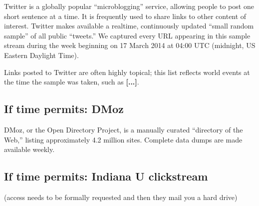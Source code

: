 \documentclass[tinymargin]{zarticle}
\def\todo#1{{\color{todocolor}\bfseries [#1]}}
\begin{document}
Twitter is a globally popular “microblogging” service, allowing people
to post one short sentence at a time.  It is frequently used to share
links to other content of interest.  Twitter makes available a
realtime, continuously updated “small random sample” of all public
“tweets.” We captured every URL appearing in this sample stream during
the week beginning on 17 March 2014 at 04:00 UTC (midnight, US Eastern
Daylight Time).

Links posted to Twitter are often highly topical; this list reflects
world events at the time the sample was taken, such as \todo{...}.

\subsection{If time permits: DMoz}

DMoz, or the Open Directory Project, is a manually curated “directory
of the Web,” listing approximately 4.2 million sites.  Complete data
dumps are made available weekly.

\subsection{If time permits: Indiana U clickstream}

(access needs to be formally requested and then they mail you a hard drive)

\printbibliography
\end{document}
